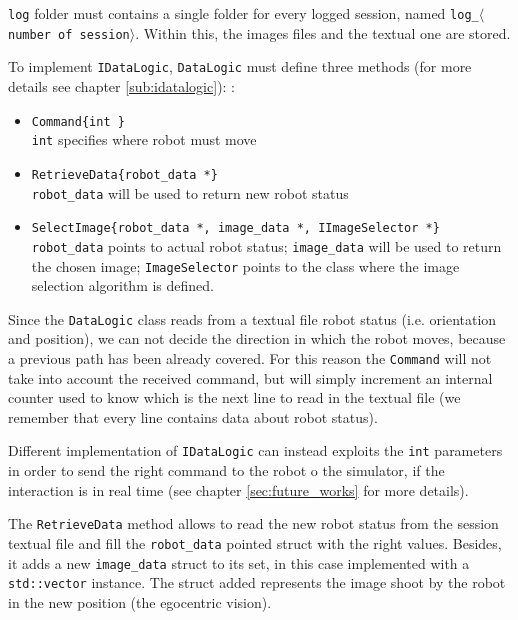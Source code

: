 %
\texttt{log} folder must contains a single folder for every logged session, named
\texttt{log\_$\langle$number of session$\rangle$}. Within this, the images files and the
textual one are stored.
%

%
To implement \texttt{IDataLogic}, \texttt{DataLogic} must define three methods (for more
details see chapter \ref{sub:idatalogic}):
:
%
\begin{itemize}

  \item \texttt{Command\{int \}} \\
    \texttt{int} specifies where robot must move 

  \item \texttt{RetrieveData\{robot\_data *\}} \\
    \texttt{robot\_data} will be used to return new robot status

  \item \texttt{SelectImage\{robot\_data *, image\_data *, IImageSelector *\}} \\
    \texttt{robot\_data} points to actual robot status; \texttt{image\_data} will be used
    to return the chosen image; \texttt{ImageSelector} points to the class where the image
    selection algorithm is defined.


\end{itemize}
%

Since the \texttt{DataLogic} class reads from a textual file robot status (i.e. orientation
and position), we can not decide the direction in which the robot moves, because a previous
path has been already covered. For this reason the \texttt{Command} will not take into account
the received command, but will simply increment an internal counter used to know which is the next
line to read in the textual file (we remember that every line contains data about robot status).
%

%
Different implementation of \texttt{IDataLogic} can instead exploits the \texttt{int} parameters
in order to send the right command to the robot o the simulator, if the interaction is in real time
(see chapter \ref{sec:future_works} for more details).
%

%
The \texttt{RetrieveData} method allows to read the new robot status from the session textual file
and fill the \texttt{robot\_data} pointed struct with the right values. Besides, it adds a new
\texttt{image\_data} struct to its set, in this case implemented with a \texttt{std::vector} instance.
The struct added represents the image shoot by the robot in the new position (the egocentric
vision).
%


